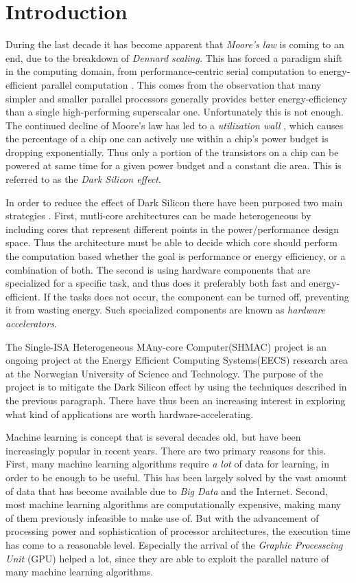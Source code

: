 \chapter{Introduction}


During the last decade it has become apparent that \textit{Moore's law} is coming to an end, due to the breakdown of \textit{Dennard scaling.} This has forced a paradigm shift  in the computing domain, from performance-centric serial computation to energy-efficient parallel computation \cite{Duranton2013}. This comes from the observation that many simpler and smaller parallel processors generally provides better energy-efficiency than a single high-performing superscalar one. Unfortunately this is not enough. The continued decline of Moore's law has led to a \textit{utilization wall} \cite{Venkatesh2010}, which causes the percentage of a chip one can actively use within a chip's power budget is dropping exponentially. Thus only a portion of the transistors on a chip can be powered at same time for a given power budget and a constant die
area. This is referred to as the \textit{Dark Silicon effect}.

In order to reduce the effect of Dark Silicon there have been purposed two main strategies \cite{Olukotun2011}. First, mutli-core architectures can be made heterogeneous by including cores that represent different points in the power/performance design space. Thus the architecture must be able to decide which core should perform the computation based whether the goal is performance or energy efficiency, or a combination of both. The second is using hardware components that are specialized for a specific task, and thus does it preferably both fast and energy-efficient. If the tasks does not occur, the component can be turned off, preventing it from wasting energy. Such specialized components are known as \textit{hardware accelerators}. 


The Single-ISA Heterogeneous MAny-core Computer(SHMAC) \cite{NTNU2014} project is an ongoing project at the Energy Efficient Computing Systems(EECS) research area at the Norwegian University of Science and Technology. The purpose of the project is to mitigate the Dark Silicon effect by using the techniques described in the previous paragraph. There have thus been an increasing interest in exploring what kind of applications are worth hardware-accelerating. 

Machine learning is concept that is several decades old, but have been increasingly popular in recent years. There are two primary reasons for this. First, many machine learning algorithms require \textit{a lot} of data for learning, in order to be enough to be useful. This has been largely solved by the vast amount of data that has become available due to \textit{Big Data} and the Internet. Second, most machine learning algorithms are computationally expensive, making many of them previously infeasible to make use of. But with the advancement of processing power and sophistication of processor architectures, the execution time has come to a reasonable level. Especially the arrival of the \textit{Graphic Processcing Unit} (GPU) helped a lot, since they are able to exploit the parallel nature of many machine learning algorithms. 

